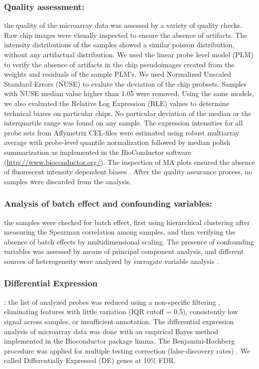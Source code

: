 \documentclass[9pt,twocolumn,twoside]{gsajnl}
\begin{document}
\subsubsection*{Quality assessment:}
the quality of the microarray data was assessed by a variety of quality checks. Raw chip images were visually inspected to ensure the absence of  artifacts. The intensity distributions of the samples showed a similar poisson distribution, without any artifactual distribution. We used the linear probe level model (PLM) \citep{Bolstad2004, Brettschneider2007} to verify the absence of artifacts in the chip pseudoimages created from the weights and residuals of the sample PLM's. We used Normalized Unscaled Standard Errors (NUSE) \citep{Bolstad2004} to evalute the deviation of the chip probsets. Samples with NUSE median value higher than 1.05 were removed. Using the same models, we also evaluated the Relative Log Expression (RLE) values \citep{Bolstad2004, Brettschneider2007} to determine technical biases on particular chips. No particular deviation of the median or the interquartile range was found on any sample. The expression intensities for all probe sets from Affymetrix CEL-files were estimated using robust multiarray average  with probe-level quantile normalization followed by median polish summarization \citep{Irizarry2003} as implemented in the BioConductor software (\url{http://www.bioconductor.org/}). The inspection of MA plots ensured the absence of fluorescent intensity dependent biases \citep{Bolstad2004}. After the quality assurance process, no samples were discarded from the analysis.

\subsubsection*{Analysis of batch effect and confounding variables:}
the samples were checked for batch effect, first using hierarchical clustering after measuring the Spearman correlation among samples, and then verifying the absence of batch effects by multidimensional scaling. The presence of confounding variables was assessed by means of principal component analysis, and different sources of heterogeneity were analyzed by surrogate variable analysis \citep{Leek2007}.

\subsubsection*{Differential Expression}: the list of analyzed probes was reduced using a non-specific filtering \citep{Bourgon2010}, eliminating features with little variation (IQR cutoff = 0.5), consistently low signal across samples, or insufficient annotation. The differential expression analysis of microarray data was done with an empirical Bayes method \citep{Smyth2004} implemented in the Bioconductor package limma. The Benjamini-Hochberg procedure was applied for multiple testing correction (false-discovery rates) \citep{Benjamini1995}. We called Differentially Expressed (DE) genes at 10\% FDR.
\end{document}
